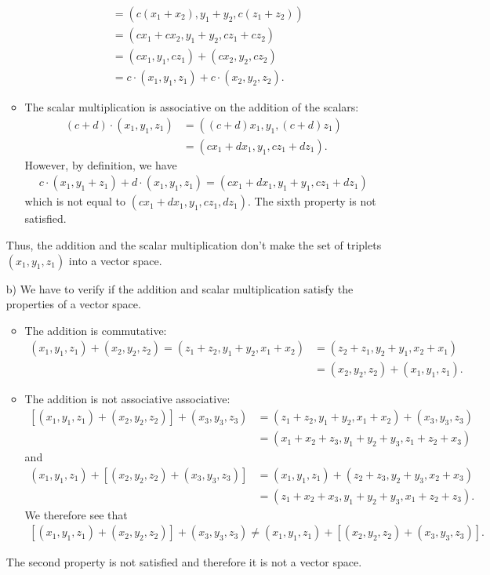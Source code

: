 \documentclass[12pt]{article}
\begin{document}
\begin{enumerate}
\begin{itemize}
\begin{align*}
			&= (c (x_1 + x_2) , y_1 + y_2 , c(z_1 + z_2) ) \\
			&= (c x_1 + c x_2 , y_1 + y_2 , cz_1 + cz_2 ) \\
			&= (cx_1, y_1 , cz_1) + (cx_2 , y_2 , cz_2) \\
			&= c \cdot (x_1 , y_1 , z_1) + c \cdot (x_2 , y_2 , z_2) .
			\end{align*}
		\item The scalar multiplication is associative on the addition of the scalars:
			\begin{align*}
			(c + d) \cdot (x_1, y_1 , z_1) &= ( (c+d) x_1, y_1, (c+d) z_1) \\
			&= (cx_1 + dx_1, y_1, cz_1 + dz_1) . 
			\end{align*}
		However, by definition, we have
			\begin{align*}
			c \cdot (x_1 , y_1 + z_1) + d \cdot (x_1 , y_1 , z_1) = ( c x_1 + d x_1, y_1 + y_1 , c z_1 + d z_1 ) 
			\end{align*}
		which is not equal to $(cx_1 + dx_1, y_1 , cz_1 , dz_1)$. The sixth property is not satisfied.
		\end{itemize}
	Thus, the addition and the scalar multiplication don't make the set of triplets $(x_1, y_1, z_1)$ into a vector space.
	\item[b)] We have to verify if the addition and scalar multiplication satisfy the properties of a vector space.
		\begin{itemize}
		\item The addition is commutative:
			\begin{align*}
			(x_1 , y_1 , z_1 ) + (x_2 , y_2 , z_2) = (z_1 + z_2 , y_1 + y_2 , x_1 + x_2) &=  (z_2 + z_1 , y_2 + y_1 , x_2 + x_1) \\
			&= (x_2, y_2 , z_2) + (x_1 , y_1 , z_1 ) .
			\end{align*}
		\item The addition is not associative associative:
			\begin{align*}
			\left[ (x_1, y_1 , z_1 ) + (x_2 , y_2 , z_2) \right] + (x_3 , y_3 , z_3) &= (z_1 + z_2 , y_1 + y_2 , x_1 + x_2 ) + (x_3 , y_3, z_3) \\
			&= (x_1 + x_2 + z_3 , y_1 + y_2 + y_3 , z_1 + z_2 + x_3 )
			\end{align*}
		and
			\begin{align*}
			(x_1 , y_1 , z_1) + \left[ (x_2 , y_2 , z_2) + (x_3 , y_3 , z_3) \right] &= (x_1  ,y_1 , z_1 ) + (z_2 + z_3 , y_2 + y_3 , x_2 + x_3) \\
			&= (z_1 + x_2 + x_3 , y_1 + y_2 + y_3 , x_1 + z_2 + z_3 ) .
			\end{align*}
		We therefore see that
			\begin{align*}
			\left[ (x_1, y_1 , z_1 ) + (x_2 , y_2 , z_2) \right] + (x_3 , y_3 , z_3)  \neq (x_1 , y_1 , z_1) + \left[ (x_2 , y_2 , z_2) + (x_3 , y_3 , z_3) \right] .
			\end{align*}
		\end{itemize}
		The second property is not satisfied and therefore it is not a vector space.
	\end{enumerate}
	
\end{document}
